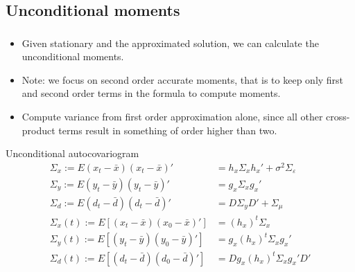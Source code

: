 \documentclass[handout]{beamer}  %
\begin{document}
\subsection{Unconditional moments}
\begin{frame}
\frametitle{\secname}\framesubtitle{\subsecname}
\begin{itemize}
  \item Given stationary and the approximated solution, we can calculate the unconditional moments.
  \item Note: we focus on second order accurate moments, that is to keep only first and second order terms in the formula to compute moments.
  \item Compute variance from first order approximation alone, since all other cross-product terms result in something of order higher than two.
\end{itemize}
\begin{block}{Unconditional autocovariogram}\footnotesize
\begin{align*}
  \Sigma_x :=  E (x_{t}-\bar{x})(x_{t}-\bar{x})' &= h_x \Sigma_x h_x' + \sigma^2 \Sigma_\varepsilon\\
  \Sigma_y := E (y_{t}-\bar{y})(y_{t}-\bar{y})' & = g_x \Sigma_x g_x'\\
  \Sigma_d := E (d_{t}-\bar{d})(d_{t}-\bar{d})' & = D \Sigma_y D' + \Sigma_\mu\\
  \Sigma_x(t) := E[(x_t- \bar{x})(x_0- \bar{x})'] &= (h_x)^t \Sigma_x\\
  \Sigma_y(t) := E[(y_t- \bar{y})(y_0- \bar{y})'] &= g_x (h_x)^t \Sigma_xg_x'\\
  \Sigma_d(t) := E[(d_t- \bar{d})(d_0- \bar{d})'] &= D g_x (h_x)^t \Sigma_xg_x' D'
\end{align*}
\end{block}
\end{frame}
\end{document}
